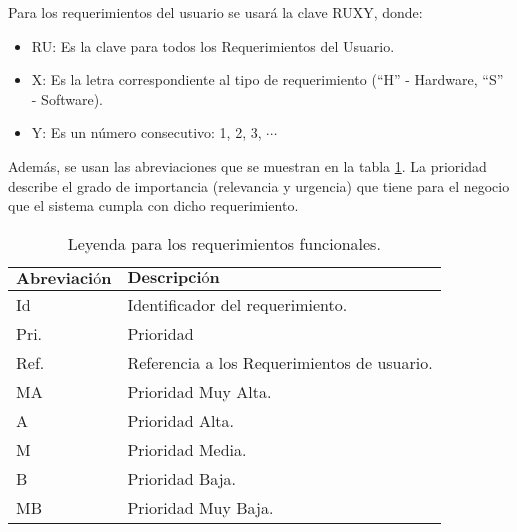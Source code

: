 Para los requerimientos del usuario se usará la clave RUXY, donde:
\begin{itemize}
	\item RU: Es la clave para todos los Requerimientos del Usuario.
	\item X: Es la letra correspondiente al tipo de requerimiento (“H” - 
	Hardware, “S” - Software).
	\item Y: Es un número consecutivo: 1, 2, 3, $\cdots$
\end{itemize}

Además, se usan las abreviaciones que se muestran en la tabla 
\ref{tab:leyenda:RFs}. La prioridad describe el grado de importancia (relevancia 
y urgencia) que tiene para el negocio que el sistema cumpla con dicho 
requerimiento.

\begin{table}[H]
	\centering 
	\caption{Leyenda para los requerimientos funcionales.}
	\label{tab:leyenda:RFs}
	\begin{tabular}{ | l | l |}
	\hline
	$\textbf{Abreviación}$ & $\textbf{Descripción}$ \\\hline
	Id & Identificador del requerimiento. \\\hline
	Pri. & Prioridad \\\hline
	Ref. & Referencia a los Requerimientos de usuario. \\\hline
	MA & Prioridad Muy Alta. \\\hline
	A & Prioridad Alta. \\\hline
	M & Prioridad Media. \\\hline
	B & Prioridad Baja. \\\hline
	MB & Prioridad Muy Baja. \\\hline
	\end{tabular}
\end{table}
